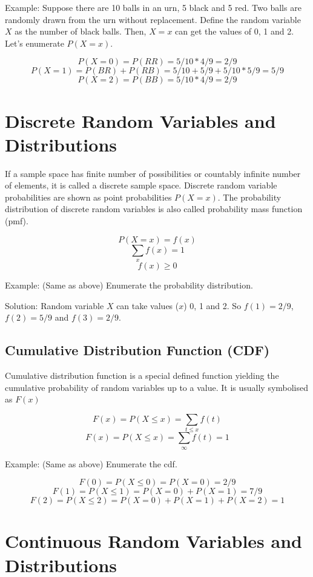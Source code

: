 \documentclass[]{book}
\theoremstyle{definition}
\theoremstyle{definition}
\theoremstyle{definition}
\theoremstyle{remark}
\begin{document}
Example: Suppose there are 10 balls in an urn, 5 black and 5 red. Two
balls are randomly drawn from the urn without replacement. Define the
random variable \(X\) as the number of black balls. Then, \(X = x\) can
get the values of 0, 1 and 2. Let's enumerate \(P(X = x)\).

\[P(X = 0) = P(RR) = 5/10 * 4/9 = 2/9\]
\[P(X = 1) = P(BR) + P(RB) = 5/10 + 5/9 + 5/10 * 5/9 = 5/9\]
\[P(X = 2) = P(BB) = 5/10 * 4/9 = 2/9\]

\hypertarget{discrete-random-variables-and-distributions}{%
\section{Discrete Random Variables and
Distributions}\label{discrete-random-variables-and-distributions}}

If a sample space has finite number of possibilities or countably
infinite number of elements, it is called a discrete sample space.
Discrete random variable probabilities are shown as point probabilities
\(P(X = x)\). The probability distribution of discrete random variables
is also called probability mass function (pmf).

\[ P(X=x) = f(x)\] \[\sum_x f(x) = 1\] \[f(x) \ge 0\]

Example: (Same as above) Enumerate the probability distribution.

Solution: Random variable \(X\) can take values (\(x\)) 0, 1 and 2. So
\(f(1) = 2/9\), \(f(2) = 5/9\) and \(f(3) = 2/9\).

\hypertarget{cumulative-distribution-function-cdf}{%
\subsection{Cumulative Distribution Function
(CDF)}\label{cumulative-distribution-function-cdf}}

Cumulative distribution function is a special defined function yielding
the cumulative probability of random variables up to a value. It is
usually symbolised as \(F(x)\)

\[F(x) = P(X \le x) = \sum_{t \le x} f(t)\]
\[F(x) = P(X \le x) = \sum_{\infty} f(t) = 1\]

Example: (Same as above) Enumerate the cdf.

\[F(0) = P(X \le 0) = P(X = 0) = 2/9\]
\[F(1) = P(X \le 1) = P(X = 0) + P(X = 1) = 7/9\]
\[F(2) = P(X \le 2) = P(X = 0) + P(X = 1) + P(X = 2) = 1\]

\hypertarget{continuous-random-variables-and-distributions}{%
\section{Continuous Random Variables and
Distributions}\label{continuous-random-variables-and-distributions}}
\end{document}
